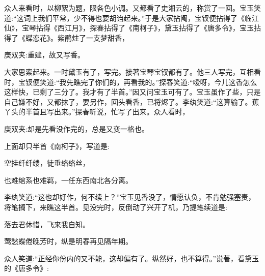 \begin{parag}
    众人来看时，以柳絮为题，限各色小调。又都看了史湘云的，称赏了一回。宝玉笑道:“这词上我们平常，少不得也要胡诌起来。”于是大家拈阄，宝钗便拈得了《临江仙》，宝琴拈得《西江月》，探春拈得了《南柯子》，黛玉拈得了《唐多令》，宝玉拈得了《蝶恋花》。紫鹃炷了一支梦甜香，\begin{note}庚双夹:重建，故又写香。\end{note}大家思索起来。一时黛玉有了，写完。接著宝琴宝钗都有了。他三人写完，互相看时，宝钗便笑道:“我先瞧完了你们的，再看我的。”探春笑道:“嗳呀，今儿这香怎么这样快，已剩了三分了。我才有了半首。”因又问宝玉可有了。宝玉虽作了些，只是自己嫌不好，又都抹了，要另作，回头看香，已将烬了。李纨笑道:“这算输了。蕉丫头的半首且写出来。”探春听说，忙写了出来。众人看时，\begin{note}庚双夹:却是先看没作完的，总是又变一格也。\end{note}上面却只半首《南柯子》，写道是:
\end{parag}


\begin{poem}
    \begin{pl}空挂纤纤缕，徒垂络络丝，\end{pl}

    \begin{pl}也难绾系也难羁，一任东西南北各分离。\end{pl}
\end{poem}


\begin{parag}
    李纨笑道:“这也却好作，何不续上？”宝玉见香没了，情愿认负，不肯勉强塞责，将笔搁下，来瞧这半首。见没完时，反倒动了兴开了机，乃提笔续道是:
\end{parag}


\begin{poem}
    \begin{pl}落去君休惜，飞来我自知。\end{pl}

    \begin{pl}莺愁蝶倦晚芳时，纵是明春再见隔年期。\end{pl}

\end{poem}


\begin{parag}
    众人笑道:“正经你份内的又不能，这却偏有了。纵然好，也不算得。”说著，看黛玉的《唐多令》:
\end{parag}


